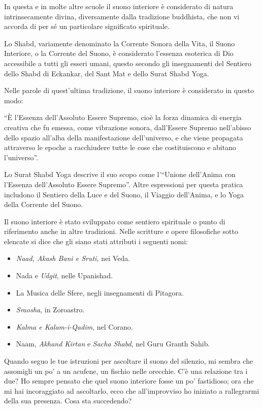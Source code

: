 In questa e in molte altre scuole il suono interiore è considerato di
natura intrinsecamente divina, diversamente dalla tradizione buddhista,
che non vi accorda di per sé un particolare significato spirituale.

Lo Shabd, variamente denominato la Corrente Sonora della Vita, il Suono
Interiore, o la Corrente del Suono, è considerato l'essenza esoterica di
Dio accessibile a tutti gli esseri umani, questo secondo gli
insegnamenti del Sentiero dello Shabd di Eckankar, del Sant Mat e dello
Surat Shabd Yoga.

Nelle parole di quest'ultima tradizione, il suono interiore è
considerato in questo modo:

``È l'Essenza dell'Assoluto Essere Supremo, cioè la forza dinamica di
energia creativa che fu emessa, come vibrazione sonora, dall'Essere
Supremo nell'abisso dello spazio all'alba della manifestazione
dell'universo, e che viene propagata attraverso le epoche a racchiudere
tutte le cose che costituiscono e abitano
l'universo''.\cite{shabd}

Lo Surat Shabd Yoga descrive il suo scopo come l'``Unione dell'Anima con
l'Essenza dell'Assoluto Essere Supremo''. Altre espressioni per questa
pratica includono il Sentiero della Luce e del Suono, il Viaggio
dell'Anima, e lo Yoga della Corrente del Suono.

Il suono interiore è stato sviluppato come sentiero spirituale o punto
di riferimento anche in altre tradizioni. Nelle scritture e opere
filosofiche sotto elencate si dice che gli siano stati attributi i
seguenti nomi:

\begin{itemize}
\item \emph{Naad, Akash Bani e Sruti,} nei Veda.
\item Nada e \emph{Udgit}, nelle Upanishad.
\item La Musica delle Sfere, negli insegnamenti di Pitagora.
\item \emph{Sraosha}, in Zoroastro.
\item \emph{Kalma e Kalam-i-Qadim}, nel Corano.
\item Naam, \emph{Akhand Kirtan} e \emph{Sacha Shabd}, nel Guru Granth Sahib.
\end{itemize}

\smallskip

Quando seguo le tue istruzioni per ascoltare il suono del silenzio,
mi sembra che assomigli un po' a un acufene, un fischio nelle orecchie.
C'è una relazione tra i due? Ho sempre pensato che quel suono interiore
fosse un po' fastidioso; ora che mi hai incoraggiato ad ascoltarlo, ecco
che all'improvviso ho iniziato a rallegrarmi della sua presenza. Cosa
sta succedendo?

